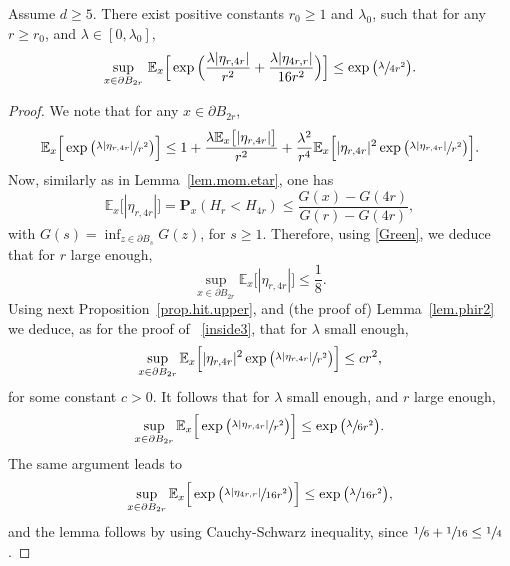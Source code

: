 \begin{lemma}\label{lem.phir3}
Assume $d\ge 5$.
There exist positive constants $r_0\ge 1$ and $\lambda_0$, such that for any $r\ge r_0$, and $\lambda\in[0,\lambda_0]$,
\[
\sup_{x\in \partial B_{2r}} \, \mathbb E_x \Big[\exp\Big(\frac{\lambda |\eta_{r,4r}|}{r^2} + \frac{\lambda |\eta_{4r,r}|}{16r^2}\Big)\Big]
\le \exp\big(\sfrac{\lambda}{4r^2}\big).
\]
\end{lemma}
\begin{proof}

We note that for any $x\in \partial B_{2r}$,
\[
\mathbb E_x\Big[\exp\big(\sfrac{\lambda |\eta_{r,4r}|}{r^2}\big)\Big] \le 1+ \frac{\lambda \mathbb E_x\big[|\eta_{r,4r}|\big]}{r^2} +
\frac{\lambda^2}{r^4} \mathbb E_x\Big[|\eta_{r,4r}|^2\exp\big(\sfrac{\lambda |\eta_{r,4r}|}{r^2}\big)\Big].
\]
Now, similarly as in Lemma~\ref{lem.mom.etar}, one has
\[
\mathbb E_x\big[|\eta_{r,4r}|\big] = \mathbf P_x(H_r<H_{4r}) \le \frac{G(x) - G(4r)}{G(r)- G(4r)},
\]
with $G(s)= \inf_{z\in \partial B_s} G(z)$, for $s\ge 1$. Therefore, using \eqref{Green}, we deduce that for $r$ large enough,
\[
\sup_{x\in \partial B_{2r}} \mathbb E_x\big[|\eta_{r,4r}|\big] \le \frac{1}{8}.
\]
Using next Proposition~\ref{prop.hit.upper}, and (the proof of) Lemma~\ref{lem.phir2} we deduce, as for the proof of ~\eqref{inside3}, that for $\lambda$ small enough,
\[
\sup_{x\in \partial B_{2r}} \mathbb E_x\Big[|\eta_{r,4r}|^2\exp\big(\sfrac{\lambda |\eta_{r,4r}|}{r^2}\big)\Big] \le c r^2,
\]
for some constant $c>0$. It follows that for $\lambda$ small enough, and $r$ large enough,
\[
\sup_{x\in \partial B_{2r}} \mathbb E_x\Big[\exp\big(\sfrac{\lambda |\eta_{r,4r}|}{r^2}\big)\Big] \le \exp\big(\sfrac{\lambda}{6r^2}\big).
\]
The same argument leads to
\[
\sup_{x\in \partial B_{2r}} \mathbb E_x\Big[\exp\big(\sfrac{\lambda |\eta_{4r,r}|}{16r^2}\big)\Big] \le \exp\big(\sfrac{\lambda}{16r^2}\big),
\]
and the lemma follows by using Cauchy-Schwarz inequality, since $\sfrac{1}{6} + \sfrac{1}{16} \le \sfrac 14$.
\end{proof}

